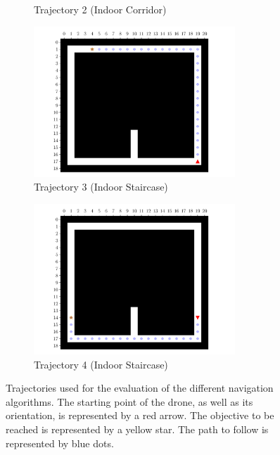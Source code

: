 \begin{figure}[H]
\begin{subfigure}{0.49\textwidth}
        \caption{Trajectory 2 (Indoor Corridor)}
        \vspace{0.5em}
    \end{subfigure}
    \begin{subfigure}{0.49\textwidth}
        \centering
        \includegraphics[width=0.83\textwidth]{resources/pdf/06/evaluation/indoor-staircase/0.pdf}
        \caption{Trajectory 3 (Indoor Staircase)}
    \end{subfigure}
    \hfill
    \begin{subfigure}{0.49\textwidth}
        \centering
        \includegraphics[width=0.83\textwidth]{resources/pdf/06/evaluation/indoor-staircase/1.pdf}
        \caption{Trajectory 4 (Indoor Staircase)}
    \end{subfigure}
    \caption{Trajectories used for the evaluation of the different navigation algorithms. The starting point of the drone, as well as its orientation, is represented by a red arrow. The objective to be reached is represented by a yellow star. The path to follow is represented by blue dots.}
    \label{fig:06.evaluation.trajectories}
\end{figure}

